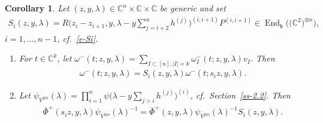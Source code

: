 \documentclass[pdftex]{sigma}
\numberwithin{equation}{section}
\newtheorem{Corollary}[Theorem]{Corollary}
\begin{document}
\begin{Corollary}\label{cor-1} Let $(z,y,\lambda)\in\mathbb C^n\times \mathbb C\times\mathbb C$ be generic and set
 \begin{gather*}
 S_i(z,y,\lambda)= R\bigg(z_i-z_{i+1},y,\lambda-y\sum_{j={i+2}}^{n}h^{(j)}\bigg)^{(i,i+1)}P^{(i,i+1)} \in\operatorname{End}_{\mathfrak h}\big(\big(\mathbb C^2\big)^{\otimes n}\big),
 \end{gather*}
 $i=1,\dots,n-1$, cf.~\eqref{e-Si}.
 \begin{enumerate}\itemsep=0pt
 \item[$(i)$] For $t\in\mathbb C^k$, let $\omega^-(t;z,y,\lambda)=\sum\limits_{I\subset[n], |I|=k}\omega^-_I(t;z,y,\lambda)v_I$. Then
 \begin{gather*}
 \omega^-(t;z,y,\lambda)=S_i(z,y,\lambda) \omega^-(t;s_iz,y,\lambda).
 \end{gather*}
 \item[$(ii)$] Let $\psi_{V^{\otimes n}}(\lambda)=\prod\limits_{i=1}^n\psi\big(\lambda-y \sum\limits_{j>i}h^{(j)}\big)^{(i)}$, cf.~Section~{\rm \ref{ss-2.2}}. Then
 \begin{gather*}
 \bar\Phi^+(s_iz,y,\lambda)\psi_{V^{\otimes n}}(\lambda)^{-1} =\bar\Phi^+(z,y,\lambda)\psi_{V^{\otimes n}}(\lambda)^{-1} S_i(z,y,\lambda).
 \end{gather*}
 \end{enumerate}
\end{Corollary}
\end{document}
